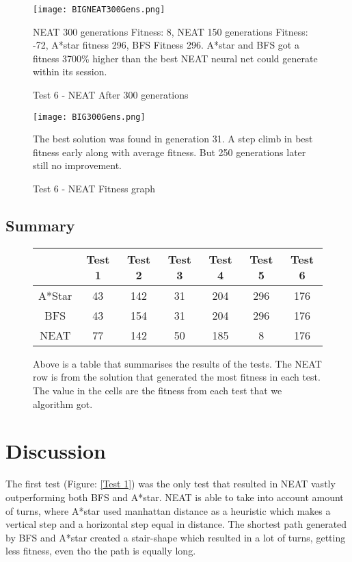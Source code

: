 \documentclass{kththesis}
\begin{document}
\begin{figure}[h]
{\centering
\begin{minipage}{1\textwidth}
\centering
\texttt{[image: BIGNEAT300Gens.png]}
\end{minipage}\hfill
\caption{Test 6 - NEAT After 300 generations}
\label{Test 6 300}
}
NEAT 300 generations Fitness: 8, NEAT 150 generations Fitness: -72, A*star fitness 296, BFS Fitness 296. A*star and BFS got a fitness 3700\% higher than the best NEAT neural net could generate within its session.
\end{figure}
 
\begin{figure}[h]
{\centering
\begin{minipage}{1\textwidth}
\centering
\texttt{[image: BIG300Gens.png]}
\end{minipage}\hfill
\caption{Test 6 - NEAT Fitness graph}
\label{Test 6 graph}
}
The best solution was found in generation 31. A step climb in best fitness early along with average fitness. But 250 generations later still no improvement.
\end{figure}

\clearpage
 
\section{Summary}
\begin{figure}[h]
\begin{center}
\begin{tabular}{c | c c c c c c }

 & Test 1 & Test 2 & Test 3 & Test 4 & Test 5 & Test 6 \\ 
\hline
A*Star & 43 & 142 & 31 & 204 & 296 & 176 \\ 
\hline
BFS & 43 & 154 & 31 & 204 & 296 & 176 \\ 
\hline
NEAT & 77 & 142 & 50 & 185 & 8 & 176  \\ 
 
\end{tabular}
\end{center}

Above is a table that summarises the results of the tests. The NEAT row is from the solution that generated the most fitness in each test. The value in the cells are the fitness from each test that we algorithm got.

\end{figure}
 
\chapter{Discussion}
The first test (Figure: \ref{Test 1}) was the only test that resulted in NEAT vastly outperforming both BFS and A*star. NEAT is able to take into account amount of turns, where A*star used manhattan distance as a heuristic which makes a vertical step and a horizontal step equal in distance. The shortest path generated by BFS and A*star created a stair-shape which resulted in a lot of turns, getting less fitness, even tho the path is equally long. 
 
\end{document}
